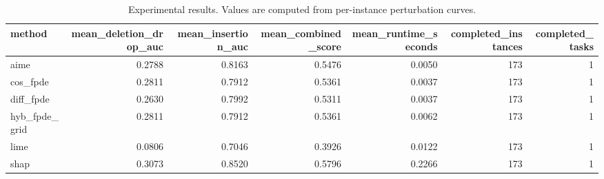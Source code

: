 \begin{table}[t]
\caption{Experimental results. Values are computed from per-instance perturbation curves.}
\label{tab:main_results_computed}
\centering
\begin{tabular}{lrrrrrr}
\toprule
method & mean\_deletion\_drop\_auc & mean\_insertion\_auc & mean\_combined\_score & mean\_runtime\_seconds & completed\_instances & completed\_tasks \\
\midrule
aime & 0.2788 & 0.8163 & 0.5476 & 0.0050 & 173 & 1 \\
cos\_fpde & 0.2811 & 0.7912 & 0.5361 & 0.0037 & 173 & 1 \\
diff\_fpde & 0.2630 & 0.7992 & 0.5311 & 0.0037 & 173 & 1 \\
hyb\_fpde\_grid & 0.2811 & 0.7912 & 0.5361 & 0.0062 & 173 & 1 \\
lime & 0.0806 & 0.7046 & 0.3926 & 0.0122 & 173 & 1 \\
shap & 0.3073 & 0.8520 & 0.5796 & 0.2266 & 173 & 1 \\
\bottomrule
\end{tabular}

\end{table}
